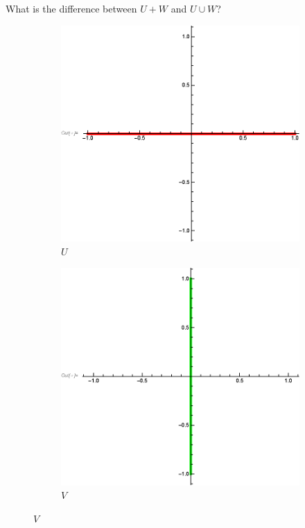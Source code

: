 \documentclass[12pt, t]{beamer}
\begin{document}
\begin{frame}[allowframebreaks]
    \newpage
    What is the difference between $U+W$ and $U\cup W$?
    \begin{figure}[ht]
        \begin{subfigure}[b]{0.2\textwidth}
            \centering
            \includegraphics[width=\linewidth]{u+w_gr1.eps}
            \caption{$U$}
        \end{subfigure}
        \begin{subfigure}[b]{0.2\textwidth}
            \centering
            \includegraphics[width=\linewidth]{u+w_gr2.eps}
            \caption{$V$}


\end{subfigure}
\end{figure}
\end{frame}
\end{document}
